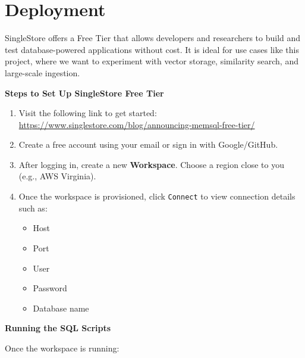 \documentclass[11pt]{article}
\begin{document}
\section*{Deployment}
\label{sec:orgc2f8d94}

SingleStore offers a Free Tier that allows developers and researchers to build and test database-powered applications without cost. It is ideal for use cases like this project, where we want to experiment with vector storage, similarity search, and large-scale ingestion.

\textbf{\textbf{Steps to Set Up SingleStore Free Tier}}

\begin{enumerate}
\item Visit the following link to get started:
\url{https://www.singlestore.com/blog/announcing-memsql-free-tier/}

\item Create a free account using your email or sign in with Google/GitHub.

\item After logging in, create a new \textbf{Workspace}. Choose a region close to you (e.g., AWS Virginia).

\item Once the workspace is provisioned, click \texttt{Connect} to view connection details such as:
\begin{itemize}
\item Host
\item Port
\item User
\item Password
\item Database name
\end{itemize}
\end{enumerate}

\textbf{\textbf{Running the SQL Scripts}}

Once the workspace is running:
\end{document}
